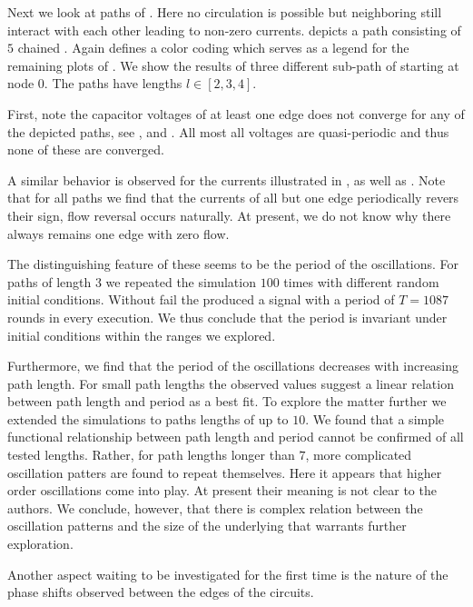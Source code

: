 		Next we look at paths of \Pes. Here no circulation is possible but neighboring \Pes still interact with each other leading to non-zero currents.  depicts a path consisting of $5$ chained \Pes. Again  defines a color coding which serves as a legend for the remaining plots of . We show the results of three different sub-path of  starting at node $0$. The paths have lengths $l \in [2,3,4]$.

		First, note the capacitor voltages of at least one edge does not converge for any of the depicted paths, see ,  and . All most all voltages are quasi-periodic and thus none of these \Pes are converged. 

		A similar behavior is observed for the currents illustrated in ,  as well as . Note that for all paths we find that the currents of all but one edge periodically revers their sign, \ie flow reversal occurs naturally. At present, we do not know why there always remains one edge with zero flow.

		The distinguishing feature of these \Pes seems to be the period of the oscillations. For paths of length $3$ we repeated the simulation $100$ times with different random initial conditions. Without fail the \Pn produced a signal with a period of $T = 1087$ rounds in every execution. We thus conclude that the period is invariant under initial conditions within the ranges we explored. 

		Furthermore, we find that the period of the oscillations decreases with increasing path length. For small path lengths the observed values suggest a linear relation between path length and period as a best fit. To explore the matter further we extended the simulations to paths lengths of up to $10$. We found that a simple functional relationship between path length and period cannot be confirmed of all tested lengths. Rather, for path lengths longer than $7$, more complicated oscillation patters are found to repeat themselves. Here it appears that higher order oscillations come into play. At present their meaning is not clear to the authors. We conclude, however, that there is complex relation between the oscillation patterns and the size of the underlying \Pes that warrants further exploration.

		Another aspect waiting to be investigated for the first time is the nature of the phase shifts observed between the edges of the circuits. 
                
